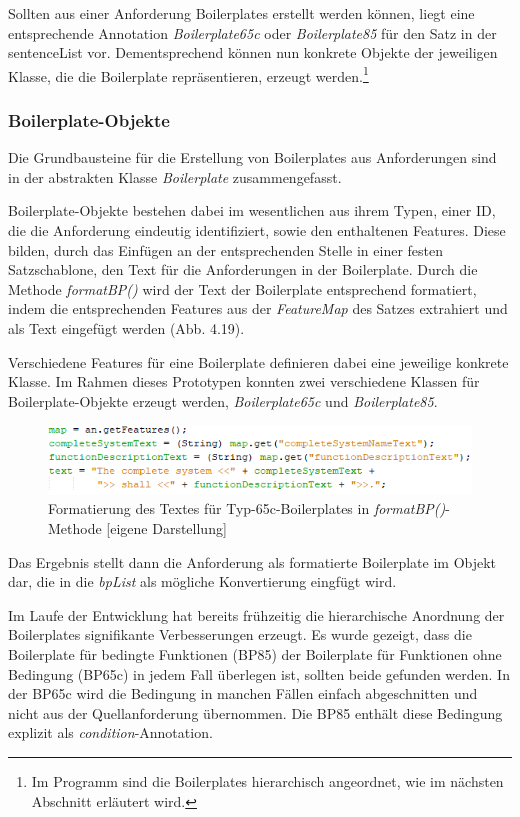 \documentclass[12pt]{report}
\begin{document}
Sollten aus einer Anforderung Boilerplates erstellt werden können, liegt eine entsprechende Annotation \textit{Boilerplate65c} oder \textit{Boilerplate85} für den Satz in der sentenceList vor. Dementsprechend können nun konkrete Objekte der jeweiligen Klasse, die die Boilerplate repräsentieren, erzeugt werden.\footnote{Im Programm sind die Boilerplates hierarchisch angeordnet, wie im nächsten Abschnitt erläutert wird.} 

\subsubsection{Boilerplate-Objekte}
Die Grundbausteine für die Erstellung von Boilerplates aus Anforderungen sind in der abstrakten Klasse \textit{Boilerplate} zusammengefasst.

Boilerplate-Objekte bestehen dabei im wesentlichen aus ihrem Typen, einer ID, die die Anforderung eindeutig identifiziert, sowie den enthaltenen Features. Diese bilden, durch das Einfügen an der entsprechenden Stelle in einer festen Satzschablone, den Text für die Anforderungen in der Boilerplate. Durch die Methode \textit{formatBP()} wird der Text der Boilerplate entsprechend formatiert, indem die entsprechenden Features aus der \textit{FeatureMap} des Satzes extrahiert und als Text eingefügt werden (Abb. 4.19). 

Verschiedene Features für eine Boilerplate definieren dabei eine jeweilige konkrete Klasse. Im Rahmen dieses Prototypen konnten zwei verschiedene Klassen für Boilerplate-Objekte erzeugt werden, \textit{Boilerplate65c} und \textit{Boilerplate85}. 

\begin{figure}[h!]
\begin{center}
\includegraphics[scale=1]{Bilder/Boilerplate-formatBP.png}
\caption{Formatierung des Textes für Typ-65c-Boilerplates in \textit{formatBP()}-Methode [eigene Darstellung]}
\end{center}
\end{figure}

Das Ergebnis stellt dann die Anforderung als formatierte Boilerplate im Objekt dar, die in die \textit{bpList} als mögliche Konvertierung eingfügt wird.

\vspace{12pt}
Im Laufe der Entwicklung hat bereits frühzeitig die hierarchische Anordnung der Boilerplates signifikante Verbesserungen erzeugt. Es wurde gezeigt, dass die Boilerplate für bedingte Funktionen (BP85) der Boilerplate für Funktionen ohne Bedingung (BP65c) in jedem Fall überlegen ist, sollten beide gefunden werden. In der BP65c wird die Bedingung in manchen Fällen einfach abgeschnitten und nicht aus der Quellanforderung übernommen. Die BP85 enthält diese Bedingung explizit als \textit{condition}-Annotation. 
\end{document}
